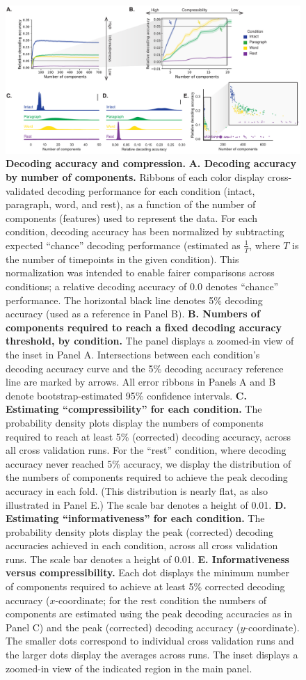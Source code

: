 \documentclass[english, 11pt]{article}
\begin{document}
\begin{figure}[tp]
  \centering
  
  \includegraphics[width=\textwidth]{figs/decoding_and_inflection}

\caption{\textbf{Decoding accuracy and compression.} \textbf{A. Decoding
accuracy by number of components.} Ribbons of each color display
cross-validated decoding performance for each condition (intact, paragraph,
word, and rest), as a function of the number of components (features) used to
represent the data. For each condition, decoding accuracy has been normalized
by subtracting expected ``chance'' decoding performance (estimated as
$\frac{1}{T}$, where $T$ is the number of timepoints in the given condition).
This normalization was intended to enable fairer comparisons across conditions;
a relative decoding accuracy of 0.0 denotes ``chance'' performance. The
horizontal black line denotes 5\% decoding accuracy (used as a reference in
Panel B). \textbf{B. Numbers of components required to reach a fixed decoding
accuracy threshold, by condition.} The panel displays a zoomed-in view of the
inset in Panel A. Intersections between each condition's decoding accuracy
curve and the 5\% decoding accuracy reference line are marked by arrows. All
error ribbons in Panels A and B denote bootstrap-estimated 95\% confidence
intervals. \textbf{C. Estimating ``compressibility'' for each condition.} The
probability density plots display the numbers of components required to reach
at least 5\% (corrected) decoding accuracy, across all cross validation runs.
For the ``rest'' condition, where decoding accuracy never reached 5\% accuracy,
we display the distribution of the numbers of components required to achieve
the peak decoding accuracy in each fold. (This distribution is nearly flat, as
also illustrated in Panel E.) The scale bar denotes a height of 0.01.
\textbf{D. Estimating ``informativeness'' for each condition.} The probability
density plots display the peak (corrected) decoding accuracies achieved in each
condition, across all cross validation runs. The scale bar denotes a height of
0.01. \textbf{E. Informativeness versus compressibility.} Each dot displays the
minimum number of components required to achieve at least 5\% corrected
decoding accuracy ($x$-coordinate; for the rest condition the numbers of
components are estimated using the peak decoding accuracies as in Panel C) and
the peak (corrected) decoding accuracy ($y$-coordinate). The smaller dots
correspond to individual cross validation runs and the larger dots display the
averages across runs. The inset displays a zoomed-in view of the indicated
region in the main panel.}


\end{figure}
\end{document}
